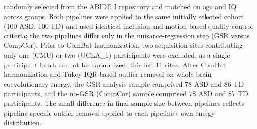 \begin{table}[H]
\begin{flushleft}
randomly selected from the ABIDE I repository and matched on age and IQ across groups. Both pipelines
were applied to the same initially selected cohort (100 ASD, 100 TD) and used identical inclusion and
motion-based quality-control criteria; the two pipelines differ only in the nuisance-regression step
(GSR versus CompCor). Prior to ComBat harmonization, two acquisition sites contributing only one
(CMU) or two (UCLA\_1) participants were excluded, as a single-participant batch cannot be
harmonized; this left 11 sites. After ComBat harmonization and Tukey IQR-based outlier removal on
whole-brain coevolutionary energy, the GSR analysis sample comprised 78 ASD and 86 TD participants,
and the no-GSR (CompCor) sample comprised 78 ASD and 87 TD participants. The small difference in
final sample size between pipelines reflects pipeline-specific outlier removal applied to each
pipeline's own energy distribution.
\end{flushleft}
\end{table}
\clearpage
\endgroup
